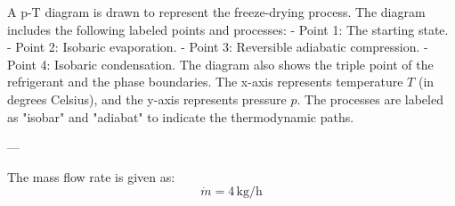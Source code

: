 A p-T diagram is drawn to represent the freeze-drying process. The diagram includes the following labeled points and processes:  
- Point 1: The starting state.  
- Point 2: Isobaric evaporation.  
- Point 3: Reversible adiabatic compression.  
- Point 4: Isobaric condensation.  
The diagram also shows the triple point of the refrigerant and the phase boundaries. The x-axis represents temperature \( T \) (in degrees Celsius), and the y-axis represents pressure \( p \). The processes are labeled as "isobar" and "adiabat" to indicate the thermodynamic paths.

---

The mass flow rate is given as:  
\[
\dot{m} = 4 \, \text{kg/h}
\]